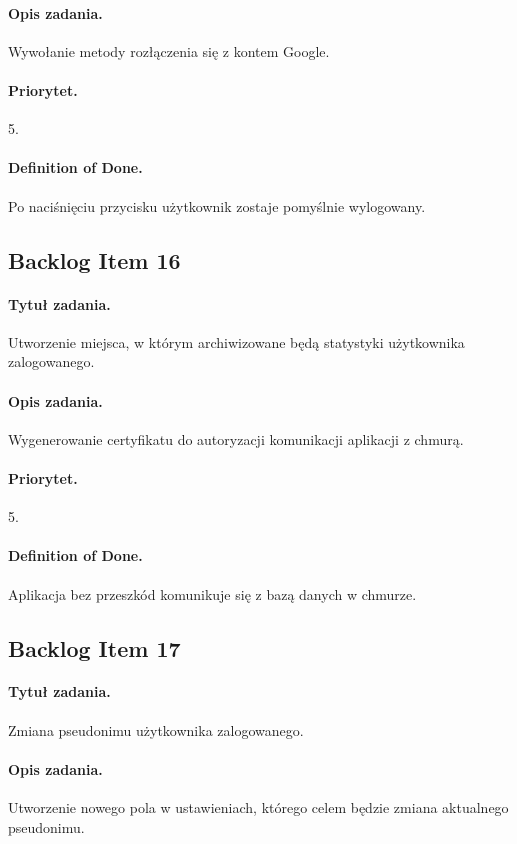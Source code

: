 \documentclass[a4paper]{article}
\begin{document}
\paragraph{Opis zadania.} Wywołanie metody rozłączenia się z kontem Google. 
\paragraph{Priorytet.} 5.
\paragraph{Definition of Done.} Po naciśnięciu przycisku użytkownik zostaje pomyślnie wylogowany.

\subsection{Backlog Item 16}
\paragraph{Tytuł zadania.} Utworzenie miejsca, w którym archiwizowane będą statystyki użytkownika zalogowanego.
\paragraph{Opis zadania.} Wygenerowanie certyfikatu do autoryzacji komunikacji aplikacji z chmurą. 
\paragraph{Priorytet.} 5.
\paragraph{Definition of Done.} Aplikacja bez przeszkód komunikuje się z bazą danych w chmurze.

\subsection{Backlog Item 17}
\paragraph{Tytuł zadania.} Zmiana pseudonimu użytkownika zalogowanego.
\paragraph{Opis zadania.} Utworzenie nowego pola w ustawieniach, którego celem będzie zmiana aktualnego pseudonimu. 
\end{document}
